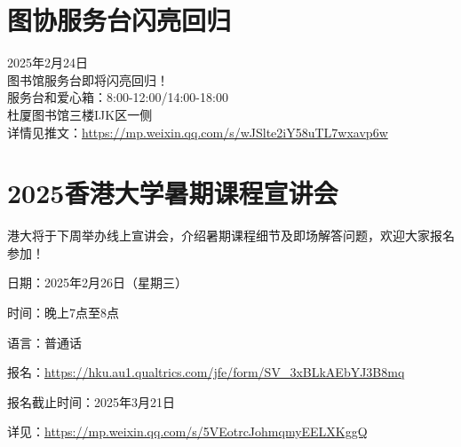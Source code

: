 \documentclass[letterpaper, 12pt]{article}
\begin{document}
\begin{multicols}{2}
\section{图协服务台闪亮回归}
2025年2月24日\\
图书馆服务台即将闪亮回归！\\
服务台和爱心箱：8:00-12:00/14:00-18:00\\
杜厦图书馆三楼IJK区一侧\\
详情见推文：\url{https://mp.weixin.qq.com/s/wJSlte2iY58uTL7wxavp6w}

\section{2025香港大学暑期课程宣讲会}
港大将于下周举办线上宣讲会，介绍暑期课程细节及即场解答问题，欢迎大家报名参加！

日期：2025年2月26日（星期三）

时间：晚上7点至8点

语言：普通话

报名：\url{https://hku.au1.qualtrics.com/jfe/form/SV_3xBLkAEbYJ3B8mq}

报名截止时间：2025年3月21日

详见：\url{https://mp.weixin.qq.com/s/5VEotrcJohmqmyEELXKggQ}
\end{multicols}
\end{document}
